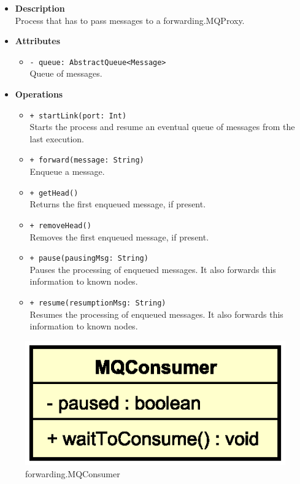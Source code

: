 \FloatBarrier
\begin{itemize}
  \item \textbf{Description} \\
    Process that has to pass messages to a forwarding.MQProxy.
  \item \textbf{Attributes}
    \begin{itemize}
      \item \texttt{- queue: AbstractQueue<Message>} \\
    Queue of messages.
    \end{itemize}
  \item \textbf{Operations}
  \begin{itemize}
    \item \texttt{+ startLink(port: Int)} \\
    Starts the process and resume an eventual queue of messages from the
    last execution.
    \item \texttt{+ forward(message: String)} \\
    Enqueue a message.
    \item \texttt{+ getHead()} \\
    Returns the first enqueued message, if present.
    \item \texttt{+ removeHead()} \\
    Removes the first enqueued message, if present.
    \item \texttt{+ pause(pausingMsg: String)} \\
    Pauses the processing of enqueued messages. It also forwards this
    information to known nodes.
    \item \texttt{+ resume(resumptionMsg: String)} \\
    Resumes the processing of enqueued messages. It also forwards this
    information to known nodes.
  \end{itemize}
\end{itemize}


\begin{figure}[H]
  \centering
  \includegraphics[width=.4\columnwidth]{images/solution/mw/fwd/mqc.eps}
  \caption{forwarding.MQConsumer}
  \label{fig:mw-forwarding-mqconsumer}
\end{figure}

